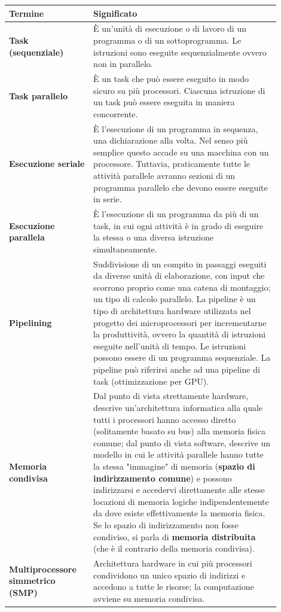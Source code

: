 	\begin{longtable}{|m{0.28\linewidth}|m{0.62\linewidth}|}
		\hline
		\textbf{Termine} & \textbf{Significato}
		\\
		\hline
		\textbf{Task (sequenziale)} & È un'unità di esecuzione o di lavoro di un programma o di un sottoprogramma. Le istruzioni sono eseguite sequenzialmente ovvero non in parallelo.
		\\
		\hline
		\textbf{Task parallelo}& È un task che può essere eseguito in modo sicuro su più processori. Ciascuna istruzione di un task può essere eseguita in maniera concorrente.
		\\
		\hline
		\textbf{Esecuzione seriale} & È l'esecuzione di un programma in sequenza, una dichiarazione alla volta. Nel senso più semplice questo accade su una macchina con un processore. Tuttavia, praticamente tutte le attività parallele avranno sezioni di un programma parallelo che devono essere eseguite in serie.
		\\
		\hline
		\textbf{Esecuzione parallela} & È l'esecuzione di un programma da più di un task, in cui ogni attività è in grado di eseguire la stessa o una diversa istruzione simultaneamente.
		\\
		\hline
		\textbf{Pipelining} & Suddivisione di un compito in passaggi eseguiti da diverse unità di elaborazione, con input che scorrono proprio come una catena di montaggio; un tipo di calcolo parallelo.  La pipeline è un tipo di architettura hardware utilizzata nel progetto dei microprocessori per incrementarne la produttività, ovvero la quantità di istruzioni eseguite nell'unità di tempo. Le istruzioni possono essere di un programma sequenziale. La pipeline può riferirsi anche ad una pipeline di task (ottimizzazione per GPU).
		\\
		\hline
		\textbf{Memoria condivisa} & Dal punto di vista strettamente hardware, descrive un'architettura informatica alla quale tutti i processori hanno accesso diretto (solitamente basato su bus) alla memoria fisica comune; dal punto di vista software, descrive un modello in cui le attività parallele hanno tutte la stessa "immagine" di memoria (\textbf{spazio di indirizzamento comune}) e possono indirizzarsi e accedervi direttamente alle stesse locazioni di memoria logiche indipendentemente da dove esiste effettivamente la memoria fisica. Se lo spazio di indirizzamento non fosse condiviso, si parla di \textbf{memoria distribuita} (che è il contrario della memoria condivisa).
		\\
		\hline
		\textbf{Multiprocessore simmetrico (SMP)} & Architettura hardware in cui più processori condividono un unico spazio di indirizzi e accedono a tutte le risorse; la computazione avviene su memoria condivisa.

\end{longtable}
